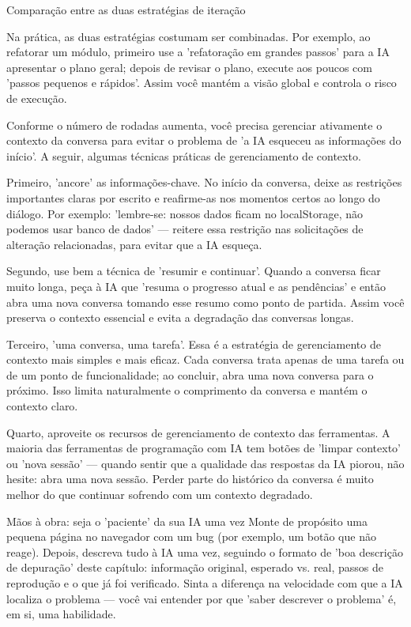 \begin{center}\small\color{gray}Comparação entre as duas estratégias de iteração\end{center}

Na prática, as duas estratégias costumam ser combinadas. Por exemplo, ao refatorar um módulo, primeiro use a 'refatoração em grandes passos' para a IA apresentar o plano geral; depois de revisar o plano, execute aos poucos com 'passos pequenos e rápidos'. Assim você mantém a visão global e controla o risco de execução.


Conforme o número de rodadas aumenta, você precisa gerenciar ativamente o contexto da conversa para evitar o problema de 'a IA esqueceu as informações do início'. A seguir, algumas técnicas práticas de gerenciamento de contexto.

Primeiro, 'ancore' as informações-chave. No início da conversa, deixe as restrições importantes claras por escrito e reafirme-as nos momentos certos ao longo do diálogo. Por exemplo: 'lembre-se: nossos dados ficam no localStorage, não podemos usar banco de dados' — reitere essa restrição nas solicitações de alteração relacionadas, para evitar que a IA esqueça.

Segundo, use bem a técnica de 'resumir e continuar'. Quando a conversa ficar muito longa, peça à IA que 'resuma o progresso atual e as pendências' e então abra uma nova conversa tomando esse resumo como ponto de partida. Assim você preserva o contexto essencial e evita a degradação das conversas longas.

Terceiro, 'uma conversa, uma tarefa'. Essa é a estratégia de gerenciamento de contexto mais simples e mais eficaz. Cada conversa trata apenas de uma tarefa ou de um ponto de funcionalidade; ao concluir, abra uma nova conversa para o próximo. Isso limita naturalmente o comprimento da conversa e mantém o contexto claro.

Quarto, aproveite os recursos de gerenciamento de contexto das ferramentas. A maioria das ferramentas de programação com IA tem botões de 'limpar contexto' ou 'nova sessão' — quando sentir que a qualidade das respostas da IA piorou, não hesite: abra uma nova sessão. Perder parte do histórico da conversa é muito melhor do que continuar sofrendo com um contexto degradado.

\begin{tcbpractice}{Mãos à obra: seja o 'paciente' da sua IA uma vez}
Monte de propósito uma pequena página no navegador com um bug (por exemplo, um botão que não reage). Depois, descreva tudo à IA uma vez, seguindo o formato de 'boa descrição de depuração' deste capítulo: informação original, esperado vs. real, passos de reprodução e o que já foi verificado. Sinta a diferença na velocidade com que a IA localiza o problema — você vai entender por que 'saber descrever o problema' é, em si, uma habilidade.

\end{tcbpractice}

